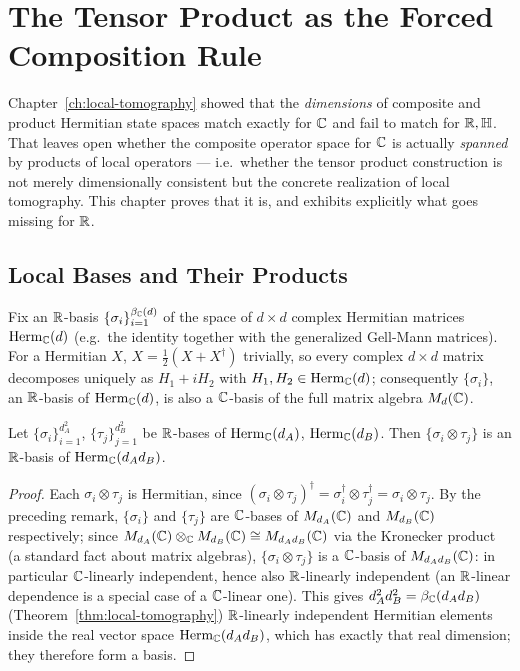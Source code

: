 \chapter{The Tensor Product as the Forced Composition Rule}
\label{ch:tensor-product}

Chapter~\ref{ch:local-tomography} showed that the \emph{dimensions} of
composite and product Hermitian state spaces match exactly for $\mathbb{C}$ and fail
to match for $\mathbb{R},\mathbb{H}$. That leaves open whether the composite operator
space for $\mathbb{C}$ is actually \emph{spanned} by products of local operators —
i.e.\ whether the tensor product construction is not merely dimensionally
consistent but the concrete realization of local tomography. This chapter
proves that it is, and exhibits explicitly what goes missing for $\mathbb{R}$.

\section{Local Bases and Their Products}

Fix an $\mathbb{R}$-basis $\{\sigma_i\}_{i=1}^{\beta_{\mathbb{C}}(d)}$ of the space of
$d\times d$ complex Hermitian matrices $\mathrm{Herm}_{\mathbb{C}}(d)$ (e.g.\ the
identity together with the generalized Gell-Mann matrices). For a Hermitian
$X$, $X = \tfrac12(X+X^\dagger) $ trivially, so every complex $d\times d$
matrix decomposes uniquely as $H_1 + iH_2$ with $H_1,H_2 \in
\mathrm{Herm}_{\mathbb{C}}(d)$; consequently $\{\sigma_i\}$, an $\mathbb{R}$-basis of
$\mathrm{Herm}_{\mathbb{C}}(d)$, is also a $\mathbb{C}$-basis of the full matrix algebra
$M_d(\mathbb{C})$.

\begin{theorem}
\label{thm:tensor-spans}
Let $\{\sigma_i\}_{i=1}^{d_A^2}$, $\{\tau_j\}_{j=1}^{d_B^2}$ be $\mathbb{R}$-bases of
$\mathrm{Herm}_{\mathbb{C}}(d_A)$, $\mathrm{Herm}_{\mathbb{C}}(d_B)$. Then $\{\sigma_i \otimes
\tau_j\}$ is an $\mathbb{R}$-basis of $\mathrm{Herm}_{\mathbb{C}}(d_Ad_B)$.
\end{theorem}

\begin{proof}
Each $\sigma_i\otimes\tau_j$ is Hermitian, since $(\sigma_i\otimes\tau_j)^\dagger
= \sigma_i^\dagger \otimes \tau_j^\dagger = \sigma_i\otimes\tau_j$. By the
preceding remark, $\{\sigma_i\}$ and $\{\tau_j\}$ are $\mathbb{C}$-bases of
$M_{d_A}(\mathbb{C})$ and $M_{d_B}(\mathbb{C})$ respectively; since $M_{d_A}(\mathbb{C})\otimes_{\mathbb{C}}
M_{d_B}(\mathbb{C}) \cong M_{d_Ad_B}(\mathbb{C})$ via the Kronecker product (a standard fact
about matrix algebras), $\{\sigma_i\otimes\tau_j\}$ is a $\mathbb{C}$-basis of
$M_{d_Ad_B}(\mathbb{C})$: in particular $\mathbb{C}$-linearly independent, hence also
$\mathbb{R}$-linearly independent (an $\mathbb{R}$-linear dependence is a special case of a
$\mathbb{C}$-linear one). This gives $d_A^2 d_B^2 = \beta_{\mathbb{C}}(d_Ad_B)$
(Theorem~\ref{thm:local-tomography}) $\mathbb{R}$-linearly independent Hermitian
elements inside the real vector space $\mathrm{Herm}_{\mathbb{C}}(d_Ad_B)$, which has
exactly that real dimension; they therefore form a basis.
\end{proof}

